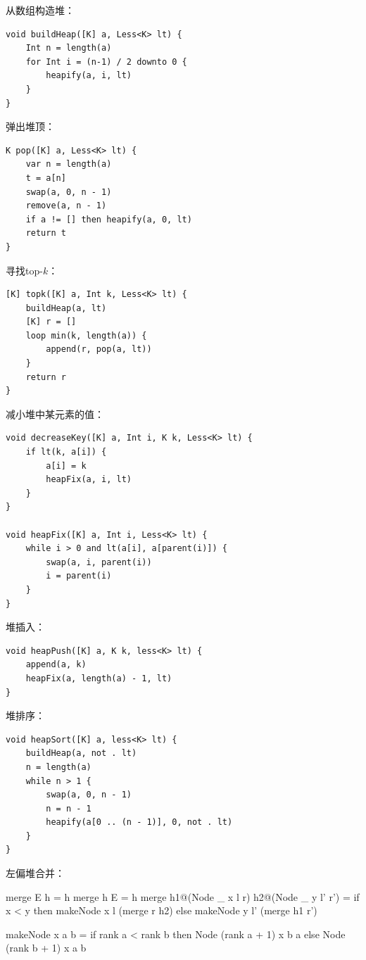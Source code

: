 \documentclass[b5paper]{ctexart}
\begin{document}
从数组构造堆：

\begin{lstlisting}[language = Bourbaki]
void buildHeap([K] a, Less<K> lt) {
    Int n = length(a)
    for Int i = (n-1) / 2 downto 0 {
        heapify(a, i, lt)
    }
}
\end{lstlisting}

弹出堆顶：

\begin{lstlisting}[language = Bourbaki]
K pop([K] a, Less<K> lt) {
    var n = length(a)
    t = a[n]
    swap(a, 0, n - 1)
    remove(a, n - 1)
    if a != [] then heapify(a, 0, lt)
    return t
}
\end{lstlisting}

寻找top-$k$：

\begin{lstlisting}[language = Bourbaki]
[K] topk([K] a, Int k, Less<K> lt) {
    buildHeap(a, lt)
    [K] r = []
    loop min(k, length(a)) {
        append(r, pop(a, lt))
    }
    return r
}
\end{lstlisting}

减小堆中某元素的值：

\begin{lstlisting}[language = Bourbaki]
void decreaseKey([K] a, Int i, K k, Less<K> lt) {
    if lt(k, a[i]) {
        a[i] = k
        heapFix(a, i, lt)
    }
}

void heapFix([K] a, Int i, Less<K> lt) {
    while i > 0 and lt(a[i], a[parent(i)]) {
        swap(a, i, parent(i))
        i = parent(i)
    }
}
\end{lstlisting}

堆插入：

\begin{lstlisting}[language = Bourbaki]
void heapPush([K] a, K k, less<K> lt) {
    append(a, k)
    heapFix(a, length(a) - 1, lt)
}
\end{lstlisting}

堆排序：

\begin{lstlisting}[language = Bourbaki]
void heapSort([K] a, less<K> lt) {
    buildHeap(a, not . lt)
    n = length(a)
    while n > 1 {
        swap(a, 0, n - 1)
        n = n - 1
        heapify(a[0 .. (n - 1)], 0, not . lt)
    }
}
\end{lstlisting}

左偏堆合并：

\begin{Haskell}
merge E h = h
merge h E = h
merge h1@(Node _ x l r) h2@(Node _ y l' r') =
    if x < y then makeNode x l (merge r h2)
    else makeNode y l' (merge h1 r')

makeNode x a b = if rank a < rank b then Node (rank a + 1) x b a
                 else Node (rank b + 1) x a b
\end{Haskell}
\end{document}
